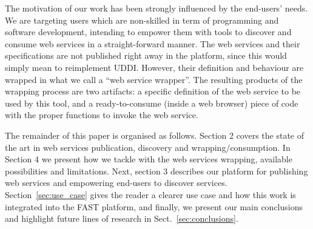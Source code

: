 The motivation of our work has been strongly influenced by the end-users' needs. We are targeting users which are non-skilled in term of programming and software development, intending to empower them with tools to discover and consume web services in a straight-forward manner.
The web services and their specifications are not published right away in the platform, since this would simply mean to reimplement UDDI.
However, their definition and behaviour are wrapped in what we call a ``web service wrapper''. The resulting products of the wrapping process are two artifacts: a specific definition of the web service to be used by this tool, and a ready-to-consume (inside a web browser) piece of code with the proper functions to invoke the web service.

The remainder of this paper is organised as follows. Section 2 covers the state of the art in web services publication, discovery and wrapping/consumption. In Section 4 we present how we tackle with the web services wrapping, available possibilities and limitations. Next, section 3 describes our platform for publishing web services and empowering end-users to discover services. Section~\ref{sec:use_case} gives the reader a clearer use case and how this work is integrated into the FAST platform, and finally, we present our main conclusions and highlight future lines of research in Sect.~\ref{sec:conclusions}.

